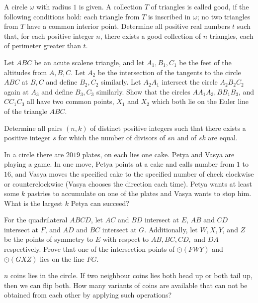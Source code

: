 \documentclass[11pt]{scrartcl}
\begin{document}
\begin{problem}[2265193939454652363]
	A circle $\omega$ with radius $1$ is given. A collection $T$ of triangles is called good, if the following conditions hold:
each triangle from $T$ is inscribed in $\omega$;
no two triangles from $T$ have a common interior point.
Determine all positive real numbers $t$ such that, for each positive integer $n$, there exists a good collection of $n$ triangles, each of perimeter greater than $t$.
\end{problem}
\begin{problem}[8330669807899443473]
Let $ABC$ be an acute scalene triangle, and let $A_1, B_1, C_1$ be the feet of the altitudes from $A, B, C$. Let $A_2$ be the intersection of the tangents to the circle $ABC$ at $B, C$ and define $B_2, C_2$ similarly. Let $A_2A_1$ intersect the circle $A_2B_2C_2$ again at $A_3$ and define $B_3, C_3$ similarly. Show that the circles $AA_1A_3, BB_1B_3$, and $CC_1C_3$ all have two common points, $X_1$ and $X_2$ which both lie on the Euler line of the triangle $ABC$.
\end{problem}
\begin{problem}[569685816807741]
Determine all pairs $(n, k)$ of distinct positive integers such that there exists a positive integer $s$ for which the number of divisors of $sn$ and of $sk$ are equal.
\end{problem}
\begin{problem}[813804034055493]
In a circle there are $2019$ plates, on each lies one cake. Petya and Vasya are playing a game. In one move, Petya points at a cake and calls number from $1$ to $16$, and Vasya moves the specified cake to the specified number of
check clockwise or counterclockwise (Vasya chooses the direction each time). Petya wants at least some $k$ pastries to accumulate on one of the plates and Vasya wants to stop him. What is the largest $k$ Petya can succeed?
\end{problem}
\begin{problem}[436681276656848]
For the quadrilateral $ABCD$, let $AC$ and $BD$ intersect at $E$, $AB$ and $CD$ intersect at $F$, and $AD$ and $BC$ intersect at $G$. Additionally, let $W, X, Y$, and $Z$ be the points of symmetry to $E$ with respect to $AB, BC, CD,$ and $DA$ respectively. Prove that one of the intersection points of $\odot(FWY)$ and $\odot(GXZ)$ lies on the line $FG$.
\end{problem}
\begin{problem}[937132258882447]
	$n$ coins lies in the circle. If two neighbour coins lies both head up or both tail up, then we can flip both. How many variants of coins are available that can not be obtained from each other by applying such operations?
\end{problem}
\end{document}
